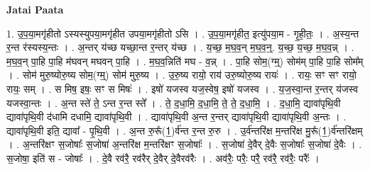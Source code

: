 \documentclass[17pt]{extarticle}
\begin{document}
\textbf{Jatai Paata} \newline

1. उ॒प॒या॒मगृ॑हीतो ऽस्यस्युपया॒मगृ॑हीत उपया॒मगृ॑हीतो ऽसि । . उ॒प॒या॒मगृ॑हीत॒ इत्यु॑पया॒म - गृ॒ही॒तः॒ । . अ॒स्य॒न्त र॒न्त र॑स्यस्य॒न्तः । . अ॒न्तर् य॑च्छ यच्छा॒न्त र॒न्तर् य॑च्छ । . य॒च्छ॒ म॒घ॒व॒न् म॒घ॒व॒न्॒. य॒च्छ॒ य॒च्छ॒ म॒घ॒व॒न्न् । . म॒घ॒व॒न् पा॒हि पा॒हि म॑घवन् मघवन् पा॒हि । . म॒घ॒व॒न्निति॑ मघ - व॒न्न् । . पा॒हि सोम॒(ग्म्॒) सोम॑म् पा॒हि पा॒हि सोम᳚म् । . सोम॑ मुरु॒ष्योरु॒ष्य सोम॒(ग्म्॒) सोम॑ मुरु॒ष्य । . उ॒रु॒ष्य रायो॒ राय॑ उरु॒ष्योरु॒ष्य रायः॑ । . रायः॒ सꣳ सꣳ रायो॒ रायः॒ सम् । . स मिष॒ इषः॒ सꣳ स मिषः॑ । . इषो॑ यजस्व यज॒स्वेष॒ इषो॑ यजस्व । . य॒ज॒स्वा॒न्त र॒न्तर् य॑जस्व यजस्वा॒न्तः । . अ॒न्त स्ते॑ ते॒ ऽन्त र॒न्त स्ते᳚ । . ते॒ द॒धा॒मि॒ द॒धा॒मि॒ ते॒ ते॒ द॒धा॒मि॒ । . द॒धा॒मि॒ द्यावा॑पृथि॒वी द्यावा॑पृथि॒वी द॑धामि दधामि॒ द्यावा॑पृथि॒वी । . द्यावा॑पृथि॒वी अ॒न्त र॒न्तर् द्यावा॑पृथि॒वी द्यावा॑पृथि॒वी अ॒न्तः । . द्यावा॑पृथि॒वी इति॒ द्यावा᳚ - पृ॒थि॒वी । . अ॒न्त रु॒रू᳚(1॒)र्व॑न्त र॒न्त रु॒रु । . उ॒र्व॑न्तरि॑क्ष म॒न्तरि॑क्ष मु॒रू᳚(1॒)र्व॑न्तरि॑क्षम् । . अ॒न्तरि॑क्षꣳ स॒जोषाः᳚ स॒जोषा॑ अ॒न्तरि॑क्ष म॒न्तरि॑क्षꣳ स॒जोषाः᳚ । . स॒जोषा॑ दे॒वैर् दे॒वैः स॒जोषाः᳚ स॒जोषा॑ दे॒वैः । . स॒जोषा॒ इति॑ स - जोषाः᳚ । . दे॒वै रव॑रै॒ रव॑रैर् दे॒वैर् दे॒वैरव॑रैः । . अव॑रैः॒ परैः॒ परै॒ रव॑रै॒ रव॑रैः॒ परैः᳚ । \newline
\end{document}
